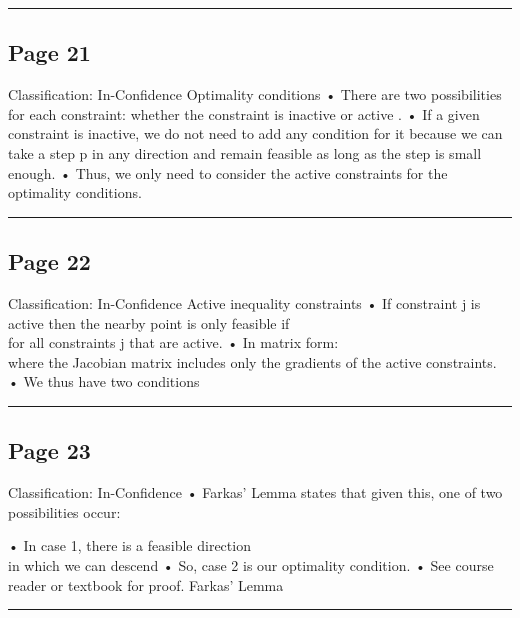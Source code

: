 \documentclass[
]{article}
\begin{document}
\begin{center}\rule{0.5\linewidth}{0.5pt}\end{center}

\subsection{Page 21}\label{page-21}

Classification: In-Confidence Optimality conditions • There are two
possibilities for each constraint: whether the constraint is inactive or
active . • If a given constraint is inactive, we do not need to add any
condition for it because we can take a step p in any direction and
remain feasible as long as the step is small enough. • Thus, we only
need to consider the active constraints for the optimality conditions.

\begin{center}\rule{0.5\linewidth}{0.5pt}\end{center}

\subsection{Page 22}\label{page-22}

Classification: In-Confidence Active inequality constraints • If
constraint j is active then the nearby point is only feasible if\\
for all constraints j that are active. • In matrix form:\\
where the Jacobian matrix includes only the gradients of the active
constraints. • We thus have two conditions

\begin{center}\rule{0.5\linewidth}{0.5pt}\end{center}

\subsection{Page 23}\label{page-23}

Classification: In-Confidence • Farkas' Lemma states that given this,
one of two possibilities occur:

• In case 1, there is a feasible direction\\
in which we can descend • So, case 2 is our optimality condition. • See
course reader or textbook for proof. Farkas' Lemma

\begin{center}\rule{0.5\linewidth}{0.5pt}\end{center}
\end{document}
